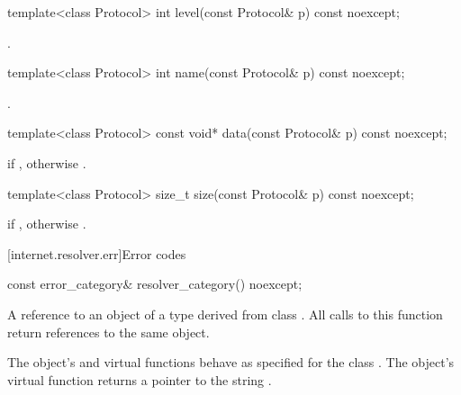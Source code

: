 \begin{itemdecl}
template<class Protocol> int level(const Protocol& p) const noexcept;
\end{itemdecl}

\begin{itemdescr}
\pnum
\returns {}.
\end{itemdescr}

\begin{itemdecl}
template<class Protocol> int name(const Protocol& p) const noexcept;
\end{itemdecl}

\begin{itemdescr}
\pnum
\returns {}.
\end{itemdescr}

\begin{itemdecl}
template<class Protocol> const void* data(const Protocol& p) const noexcept;
\end{itemdecl}

\begin{itemdescr}
\pnum
\returns {} if , otherwise .
\end{itemdescr}

\begin{itemdecl}
template<class Protocol> size_t size(const Protocol& p) const noexcept;
\end{itemdecl}

\begin{itemdescr}
\pnum
\returns {} if , otherwise .
\end{itemdescr}




[internet.resolver.err]{Error codes}

\begin{itemdecl}
const error_category& resolver_category() noexcept;
\end{itemdecl}

\begin{itemdescr}
\pnum
\returns A reference to an object of a type derived from class . All calls to this function return references to the same object.

\pnum
The object’s  and  virtual functions behave as specified for the class . The object’s  virtual function returns a pointer to the string .
\end{itemdescr}

